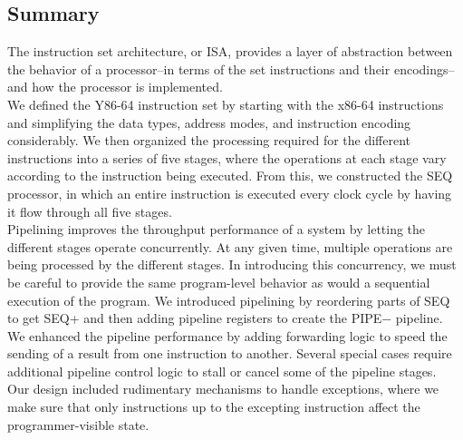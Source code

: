 \documentclass[11pt]{article}
\begin{document}
\subsection{Summary}
\label{sec:orge1d6839}
The instruction set architecture, or ISA, provides a layer of abstraction between the behavior of a processor--in terms of the set instructions and their encodings--and how the processor is implemented.\\

We defined the Y86-64 instruction set by starting with the x86-64 instructions and simplifying the data types, address modes, and instruction encoding considerably. We then organized the processing required for the different instructions into a series of five stages, where the operations at each stage vary according to the instruction being executed. From this, we constructed the SEQ processor, in which an entire instruction is executed every clock cycle by having it flow through all five stages.\\

Pipelining improves the throughput performance of a system by letting the different stages operate concurrently. At any given time, multiple operations are being processed by the different stages. In introducing this concurrency, we must be careful to provide the same program-level behavior as would a sequential execution of the program. We introduced pipelining by reordering parts of SEQ to get SEQ+ and then adding pipeline registers to create the PIPE− pipeline. We enhanced the pipeline performance by adding forwarding logic to speed the sending of a result from one instruction to another. Several special cases require additional pipeline control logic to stall or cancel some of the pipeline stages.\\

Our design included rudimentary mechanisms to handle exceptions, where we make sure that only instructions up to the excepting instruction affect the programmer-visible state.\\
\end{document}
